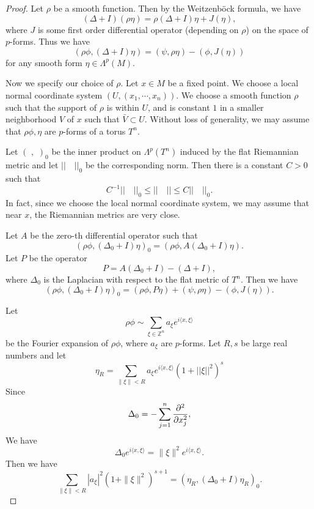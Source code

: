 \begin{proof}

Let $\rho$ be a smooth function. Then by the Weitzenb\"ock formula, we have
\begin{equation}\label{rst}
(\Delta+I)(\rho\eta)=\rho(\Delta+I)\eta+J(\eta),
\end{equation}
where $J$ is some first order differential operator (depending on $\rho$) on the space of $p$-forms. Thus we have
\begin{equation}\label{pqr}
(\rho\phi, (\Delta+I)\eta)=(\psi,\rho\eta)-(\phi,J(\eta))
\end{equation}
for any smooth form $\eta\in\Lambda^p(M)$.

Now we specify our choice of $\rho$. Let $x\in M$ be a fixed point. We choose a local normal coordinate system $(U,(x_1,\cdots,x_n))$. We choose a smooth function $\rho$ such that
the support of $\rho$ is within $U$, and is constant $1$ in a smaller neighborhood $V$ of $x$ such that $\bar V\subset U$. Without loss of generality, we may assume that $\rho\phi,\eta$ are $p$-forms of a  torus $T^n$.

Let $(\,\,,\,\,)_0$ be the inner product on $\Lambda^p(T^n)$ induced by the flat Riemannian metric and let $||\quad||_0$ be the corresponding norm. Then there is a constant $C>0$ such that
\[
C^{-1}||\quad||_0\leq ||\quad||\leq C||\quad||_0.
\]
In fact, since we choose the local normal coordinate system, we may assume that near $x$, the Riemannian metrics are very close. 

Let $A$ be the zero-th differential operator such that
\[
(\rho\phi,(\Delta_0+I)\eta)_0=(\rho\phi, A(\Delta_0+I)\eta).
\]
Let $P$ be the operator
\[
P=A(\Delta_0+I)-(\Delta+I),
\]
where $\Delta_0$ is the Laplacian with respect to the flat metric of $T^n$. Then we have
\[
(\rho\phi,(\Delta_0+I)\eta)_0=(\rho\phi, P\eta)+(\psi,\rho\eta)-(\phi, J(\eta)).
\]



Let
\[
\rho\phi\sim\sum_{\xi\in\mathbb Z^n}a_\xi e^{i\langle x,\xi\rangle}
\]
be the Fourier expansion of $\rho\phi$, where $a_\xi$ are  $p$-forms.
Let $R,s$ be  large real numbers and let 
\[
\eta_R=\sum_{\|\xi\|<R}a_\xi e^{i\langle x,\xi\rangle}(1+||\xi||^2)^{s}
\]
Since
\[
\Delta_0=-\sum_{j=1}^n\frac{\partial^2}{\partial x_j^2},
\]
We have
\[
\Delta_0 e^{i\langle x,\xi\rangle}=\|\xi\|^2e^{i\langle x,\xi\rangle}.
\]
Then we have
\begin{equation}\label{12}
\sum_{\|\xi\|<R}|a_\xi|^2(1+\|\xi\|^2)^{s+1}=(\eta_R,(\Delta_0+I)\eta_R)_0.
\end{equation}


\end{proof}
